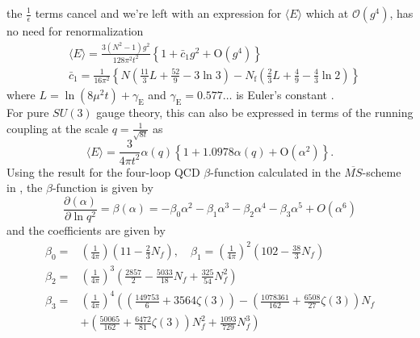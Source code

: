 \documentclass[a4paper,10pt]{article}
\begin{document}
the $\frac{1}{\epsilon}$ terms cancel and we're left with an expression for $\langle  E \rangle$ which at $\mathcal{O}(g^4)$, has no need for renormalization
\begin{equation}
\begin{aligned}
&\langle E\rangle=\frac{3\left(N^{2}-1\right) g^{2}}{128 \pi^{2} t^{2}}\left\{1+\bar{c}_{1} g^{2}+\mathrm{O}\left(g^{4}\right)\right\} \\
&\bar{c}_{1}=\frac{1}{16 \pi^{2}}\left\{N\left(\frac{11}{3} L+\frac{52}{9}-3 \ln 3\right)-N_{\mathrm{f}}\left(\frac{2}{3} L+\frac{4}{9}-\frac{4}{3} \ln 2\right)\right\}
\end{aligned}
\end{equation}
where $L=\ln \left(8 \mu^{2} t\right)+\gamma_{\mathrm{E}}$ and $\gamma_{\mathrm{E}}=0.577\ldots$ is Euler's constant  \cite{Luscher2010}.\\For pure $SU(3)$ gauge theory, this can also be expressed in terms of the running coupling at the scale $q=\frac{1}{\sqrt{8t}}$ as
\begin{equation}\label{eq:leadingOrder_pt_E}
\langle E\rangle=\frac{3}{4 \pi t^{2}} \alpha(q)\left\{1+1.0978\alpha(q)+\mathrm{O}\left(\alpha^{2}\right)\right\}.
\end{equation}
Using the result for the four-loop QCD $\beta$-function calculated in the $\overline{MS}$-scheme in \cite{vanRitbergenT1997}, the $\beta$-function is given by
\begin{equation}
\frac{\partial \left( \alpha\right)}{\partial \ln q^{2}}=\beta\left(\alpha\right)=-\beta_{0} \alpha^{2}-\beta_{1} \alpha^{3}-\beta_{2} \alpha^{4}-\beta_{3} \alpha^{5}+O\left(\alpha^{6}\right)
\end{equation}
and the coefficients are given by
\begin{equation}
\begin{aligned}
\beta_{0}=&\left( \frac{1}{4\pi} \right)\left( 11-\frac{2}{3} N_{f} \right), \quad \beta_{1}=\left( \frac{1}{4\pi} \right)^2\left( 102-\frac{38}{3} N_{f} \right)\\ \beta_{2}=&\left( \frac{1}{4\pi} \right)^3\left( \frac{2857}{2}-\frac{5033}{18} N_{f}+\frac{325}{54} N_{f}^{2} \right)\\ \beta_{3}=&\left( \frac{1}{4\pi} \right)^4\left(\left(\frac{149753}{6}+3564 \zeta(3)\right)-\left(\frac{1078361}{162}+\frac{6508}{27} \zeta(3)\right) N_{f}\right.\\&\left.+\left(\frac{50065}{162}+\frac{6472}{81} \zeta(3)\right) N_{f}^{2}+\frac{1093}{729} N_{f}^{3}\right)
\end{aligned}
\end{equation}
\end{document}
